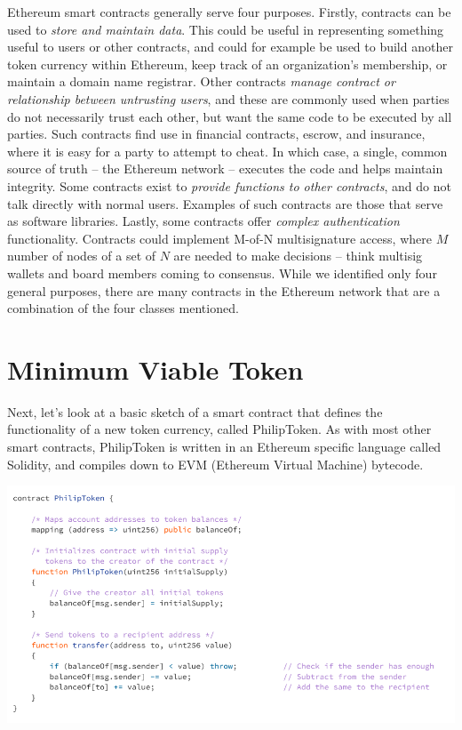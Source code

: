 \documentclass[full.tex]{subfiles}
\begin{document}
    Ethereum smart contracts generally serve four purposes. Firstly, contracts can be used to \textit{store and maintain data}. This could be useful in representing something useful to users or other contracts, and could for example be used to build another token currency within Ethereum, keep track of an organization's membership, or maintain a domain name registrar. Other contracts \textit{manage contract or relationship between untrusting users}, and these are commonly used when parties do not necessarily trust each other, but want the same code to be executed by all parties. Such contracts find use in financial contracts, escrow, and insurance, where it is easy for a party to attempt to cheat. In which case, a single, common source of truth -- the Ethereum network -- executes the code and helps maintain integrity. Some contracts exist to \textit{provide functions to other contracts}, and do not talk directly with normal users. Examples of such contracts are those that serve as software libraries. Lastly, some contracts offer \textit{complex authentication} functionality. Contracts could implement M-of-N multisignature access, where $M$ number of nodes of a set of $N$ are needed to make decisions -- think multisig wallets and board members coming to consensus. While we identified only four general purposes, there are many contracts in the Ethereum network that are a combination of the four classes mentioned.
    
    \section*{Minimum Viable Token}
    
    Next, let's look at a basic sketch of a smart contract that defines the functionality of a new token currency, called PhilipToken. As with most other smart contracts, PhilipToken is written in an Ethereum specific language called Solidity, and compiles down to EVM (Ethereum Virtual Machine) bytecode.
    
    \begin{center}
        \includegraphics[scale=0.5]{mvt}
    \end{center}
    
\end{document}
